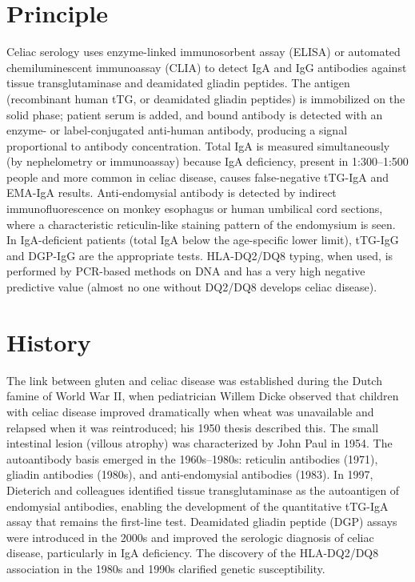 \section*{Principle}
Celiac serology uses enzyme-linked immunosorbent assay (ELISA) or automated chemiluminescent immunoassay (CLIA) to detect IgA and IgG antibodies against tissue transglutaminase and deamidated gliadin peptides. The antigen (recombinant human tTG, or deamidated gliadin peptides) is immobilized on the solid phase; patient serum is added, and bound antibody is detected with an enzyme- or label-conjugated anti-human antibody, producing a signal proportional to antibody concentration. Total IgA is measured simultaneously (by nephelometry or immunoassay) because IgA deficiency, present in 1:300--1:500 people and more common in celiac disease, causes false-negative tTG-IgA and EMA-IgA results. Anti-endomysial antibody is detected by indirect immunofluorescence on monkey esophagus or human umbilical cord sections, where a characteristic reticulin-like staining pattern of the endomysium is seen. In IgA-deficient patients (total IgA below the age-specific lower limit), tTG-IgG and DGP-IgG are the appropriate tests. HLA-DQ2/DQ8 typing, when used, is performed by PCR-based methods on DNA and has a very high negative predictive value (almost no one without DQ2/DQ8 develops celiac disease).

\section*{History}
The link between gluten and celiac disease was established during the Dutch famine of World War II, when pediatrician Willem Dicke observed that children with celiac disease improved dramatically when wheat was unavailable and relapsed when it was reintroduced; his 1950 thesis described this. The small intestinal lesion (villous atrophy) was characterized by John Paul in 1954. The autoantibody basis emerged in the 1960s--1980s: reticulin antibodies (1971), gliadin antibodies (1980s), and anti-endomysial antibodies (1983). In 1997, Dieterich and colleagues identified tissue transglutaminase as the autoantigen of endomysial antibodies, enabling the development of the quantitative tTG-IgA assay that remains the first-line test. Deamidated gliadin peptide (DGP) assays were introduced in the 2000s and improved the serologic diagnosis of celiac disease, particularly in IgA deficiency. The discovery of the HLA-DQ2/DQ8 association in the 1980s and 1990s clarified genetic susceptibility.

